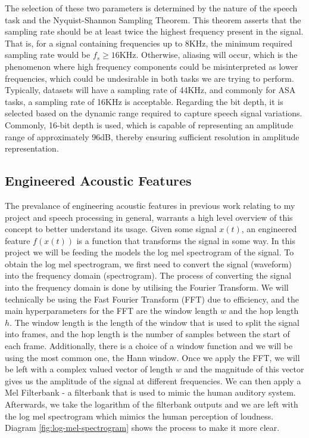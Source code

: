 \documentclass[logo,bsc,singlespacing,parskip,online]{infthesis}
\begin{document}
The selection of these two parameters is determined by the nature of the speech task and the Nyquist-Shannon Sampling Theorem.
This theorem asserts that the sampling rate should be at least twice the highest frequency present in the signal. 
That is, for a signal containing frequencies up to 8KHz, the minimum required sampling rate would be $f_s \ge 16$KHz.
Otherwise, aliasing will occur, which is the phenomenon where high frequency components could be misinterpreted as lower frequencies,
which could be undesirable in both tasks we are trying to perform. Typically, datasets will have a sampling rate 
of 44KHz, and commonly for ASA tasks, a sampling rate of 16KHz is acceptable. 
Regarding the bit depth, it is selected based on the dynamic range required to capture speech signal variations. 
Commonly, 16-bit depth is used, which is capable of representing an amplitude range of approximately 96dB, thereby ensuring sufficient resolution in amplitude representation.

\subsection{Engineered Acoustic Features}
The prevalance of engineering acoustic features in previous work relating to my project and speech processing in general,
warrants a high level overview of this concept to better understand its usage. 
Given some signal $x(t)$, an engineered feature $f(x(t))$ is a function that transforms the signal in some way.
In this project we will be feeding the models the log mel spectrogram of the signal. To obtain the log mel spectrogram, 
we first need to convert the signal (waveform) into the frequency domain (spectrogram).
The process of converting the signal into the frequency domain is done by utilising 
the Fourier Transform. We will technically be using the Fast Fourier Transform (FFT) 
due to efficiency, and the main hyperparameters for the FFT are the window length $w$ 
and the hop length $h$. The window length is the length of the window that is used to 
split the signal into frames, and the hop length is the number of samples between the 
start of each frame. Additionally, there is a choice of a window function and we will 
be using the most common one, the Hann window. Once we apply the FFT, we will be 
left with a complex valued vector of length $w$ and the magnitude of this vector 
gives us the amplitude of the signal at different frequencies. 
We can then apply a Mel Filterbank - a filterbank that is used to mimic the human auditory system. 
Afterwards, we take the logarithm of the filterbank outputs and we are left with the log mel spectrogram 
which mimics the human perception of loudness. Diagram \ref{fig:log-mel-spectrogram} shows the process to make it more clear.
\end{document}
